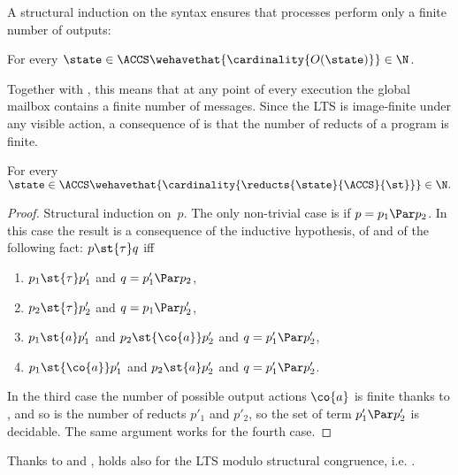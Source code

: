 A structural induction on the syntax ensures that processes perform only a finite
number of outputs:
\begin{lemma}%
  \label{lem:output-sets-finite}
  For every $\state \in \ACCS \wehavethat {\cardinality{O(\state)}} \in \N$.
\end{lemma}
\noindent
Together with , this means that at any point
of every execution the global mailbox contains a finite number of
messages. Since %
the LTS is image-finite under any visible action,
a consequence of  is that the number of reducts
of a program is finite.

\renewcommand{\stateA}{p'}
\begin{lemma}%
  \label{lem:st-finite-image}
  \label{lem:sttau-finite-image}
  For every $\state \in \ACCS \wehavethat {\cardinality{\reducts{
        \state }{\ACCS}{\st}}} \in \N.$
\end{lemma}
\begin{proof}
  Structural induction on~$p$. The only non-trivial case is if $ p = p_1 \Par p_2$.
  In this case the result is a consequence of the inductive hypothesis, of  and
  of the following fact: $ p \st{\tau} q $ iff
  \begin{enumerate}
    \item $p_1 \st{\tau} p'_1 $ and $q = p'_1 \Par p_2$,
    \item $p_2 \st{\tau} p'_2 $ and $q = p_1 \Par p'_2$,
    \item $p_1 \st{ a } p'_1 $ and $ p_2 \st{\co{a}} p'_2 $ and  $q =  p'_1 \Par p'_2$,
    \item $p_1 \st{ \co{a} } p'_1 $ and $ p_2 \st{ a } p'_2 $ and  $q =  p'_1 \Par p'_2$.
  \end{enumerate}
  In the third case the number of possible output actions $\co{a}$ is finite thanks to ,
  and so is the number of reducts $p'_1$ and $p'_2$, so the set of term $ p'_1 \Par p'_2 $ is decidable.
  The same argument works for the fourth case.
\end{proof}



Thanks to %
 and
,  holds also for the LTS modulo structural congruence,
i.e. \lts{\modulo{\ACCS}{\equiv}}{\modulo{\st{}}{\equiv}}{\Acttau}.


